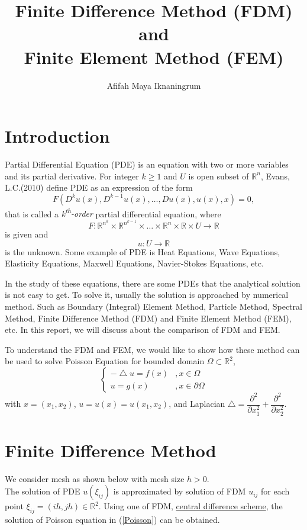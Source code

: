 \documentclass[]{report}
\title{Finite Difference Method (FDM) and \\Finite Element Method (FEM)}
\author{Afifah Maya Iknaningrum}
\newcommand{\R}{\mathbb{R}}
\begin{document}
\maketitle

\section{Introduction}
Partial Differential Equation (PDE) is an equation with two or more variables and its partial derivative. For integer $ k \geq 1 $ and $ U $ is open subset of $ \R^n $, Evans, L.C.(2010) define PDE as an expression of the form
\[ F(D^k u(x), D^{k-1} u(x), \dots , Du(x), u(x), x)=0, \]
that is called a \textit{k\textsuperscript{th}-order} partial differential equation, where
\[ F : \R^{n^{k}} \times \R^{n^{k-1}} \times \dots \times \R^{n} \times \R \times U \rightarrow \R \]
is given and
\[ u : U \rightarrow \R \]
is the unknown. Some example of PDE is Heat Equations, Wave Equations, Elasticity Equations, Maxwell Equations, Navier-Stokes Equations, etc.

In the study of these equations, there are some PDEs that the analytical solution is not easy to get. To solve it, usually the solution is approached by numerical method. Such as Boundary (Integral) Element Method, Particle Method, Spectral Method, Finite Difference Method (FDM) and Finite Element Method (FEM), etc. In this report, we will discuss about the comparison of FDM and FEM.

To understand the FDM and FEM, we would like to show how these method can be used to solve Poisson Equation for bounded domain $ \Omega \subset \R^2 $,
\begin{equation} \label{Poisson}
\begin{cases}
- \bigtriangleup u = f(x) &, x\in\Omega\\
u = g(x) &, x \in \partial \Omega
\end{cases}
\end{equation}
with $ x=(x_{1},x_{2}) $, $ u=u(x)=u(x_{1},x_{2}) $, and Laplacian $ \bigtriangleup = \dfrac{\partial^2}{\partial x_{1}^2} + \dfrac{\partial^2}{\partial x_{2}^2} $.

\section{Finite Difference Method}
We consider mesh as shown below with mesh size $ h>0 $.
\vspace{3cm}
\\The solution of PDE $ u(\xi_{ij}) $ is approximated by solution of FDM $ u_{ij} $ for each point $ \xi_{ij} = (ih,jh) \in \R^2 $. Using one of FDM, \underline{central difference scheme}, the solution of Poisson equation in (\ref{Poisson}) can be obtained. 
\end{document}
